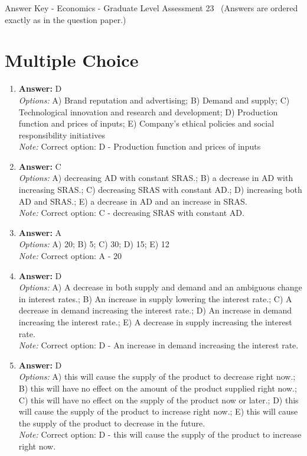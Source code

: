 \documentclass[12pt]{article}
\begin{document}
\begin{center}
Answer Key - Economics - Graduate Level Assessment 23 \
\small (Answers are ordered exactly as in the question paper.)
\end{center}

\section*{Multiple Choice}
\begin{enumerate}[label=\arabic*.]
\item \textbf{Answer:} D
\\ \textit{Options:} A) Brand reputation and advertising; B) Demand and supply; C) Technological innovation and research and development; D) Production function and prices of inputs; E) Company's ethical policies and social responsibility initiatives
\\ \textit{Note:} Correct option: D - Production function and prices of inputs
\item \textbf{Answer:} C
\\ \textit{Options:} A) decreasing AD with constant SRAS.; B) a decrease in AD with increasing SRAS.; C) decreasing SRAS with constant AD.; D) increasing both AD and SRAS.; E) a decrease in AD and an increase in SRAS.
\\ \textit{Note:} Correct option: C - decreasing SRAS with constant AD.
\item \textbf{Answer:} A
\\ \textit{Options:} A) 20; B) 5; C) 30; D) 15; E) 12
\\ \textit{Note:} Correct option: A - 20
\item \textbf{Answer:} D
\\ \textit{Options:} A) A decrease in both supply and demand and an ambiguous change in interest rates.; B) An increase in supply lowering the interest rate.; C) A decrease in demand increasing the interest rate.; D) An increase in demand increasing the interest rate.; E) A decrease in supply increasing the interest rate.
\\ \textit{Note:} Correct option: D - An increase in demand increasing the interest rate.
\item \textbf{Answer:} D
\\ \textit{Options:} A) this will cause the supply of the product to decrease right now.; B) this will have no effect on the amount of the product supplied right now.; C) this will have no effect on the supply of the product now or later.; D) this will cause the supply of the product to increase right now.; E) this will cause the supply of the product to decrease in the future.
\\ \textit{Note:} Correct option: D - this will cause the supply of the product to increase right now.
\end{enumerate}
\end{document}
